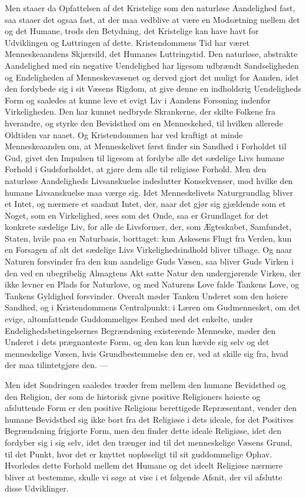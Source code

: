 \documentclass[12pt,a4paper,openany]{book}
\newcommand{\opage}[1]{\marginnote{\footnotesize\textit{[#1]}}}
\begin{document}
Men staaer da Opfattelsen af det Kristelige som den
naturløse Aandelighed fast, saa staaer det ogsaa fast, at der
maa vedblive at være en Modsætning mellem det og det
\opage{455}Humane, trods den Betydning, det Kristelige kan have havt for
Udviklingen og Luttringen af dette. Kristendommens Tid har
været Menneskeaandens Skjærsild, det Humanes Luttringstid.
Den naturløse, abstrakte Aandelighed med sin negative Uendelighed
har ligesom udbrændt Sandseligheden og Endeligheden
af Menneskevæsenet og derved gjort det muligt for Aanden,
idet den fordybede sig i sit Væsens Rigdom, at give denne
en indholdsrig Uendeligheds Form og saaledes at kunne leve
et evigt Liv i Aandens Forsoning indenfor Virkeligheden.
Den har kunnet nedbryde Skrankerne, der skilte Folkene fra
hverandre, og styrke den Bevidsthed om en Menneskehed, til
hvilken allerede Oldtiden var naaet. Og Kristendommen
har ved kraftigt at minde Menneskeaanden om, at Menneskelivet
først finder sin Sandhed i Forholdet til Gud, givet
den Impulsen til ligesom at fordybe alle det sædelige Livs
humane Forhold i Gudsforholdet, at gjøre dem alle til religiøse
Forhold. Men den naturløse Aandeligheds Livsanskuelse
indeslutter Konsekvenser, mod hvilke den humane Livsanskuelse
maa værge sig. Idet Menneskelivets Naturgrundlag
bliver et Intet, og nærmere et saadant Intet, der, naar det
gjør sig gjældende som et Noget, som en Virkelighed, sees
som det Onde, saa er Grundlaget for det konkrete sædelige
Liv, for alle de Livsformer, der, som Ægteskabet, Samfundet,
Staten, hvile paa en Naturbasis, borttaget: kun
Askesens Flugt fra Verden, kun en Forsagen af alt det sædelige
Livs Virkelighedsindhold bliver tilbage. Og naar
Naturen forsvinder fra den kun aandelige Guds Væsen, saa
bliver Guds Virken i den ved en ubegribelig Almagtens
Akt satte Natur den undergjørende Virken, der ikke levner en
Plads for Naturlove, og med Naturens Love falde Tankens
Love, og Tankens Gyldighed forsvinder. Overalt møder
Tanken Underet som den høiere Sandhed, og i Kristendommens
Centralpunkt: i Læren om Gudmennesket, om det evige,
altomfattende Guddommeliges Eenhed med det enkelte, under
Endelighedsbetingelsernes Begrændsning existerende Menneske,
møder den Underet i dets prægnanteste Form, og den kan
\opage{456}kun hævde sig selv og det menneskelige Væsen, hvis Grundbestemmelse
den er, ved at skille sig fra, hvad der maa tilintetgjøre
den. ---

Men idet Sondringen saaledes træder frem mellem den
humane Bevidsthed og den Religion, der som de historisk
givne positive Religioners høieste og afsluttende Form er
den positive Religions berettigede Repræsentant, vender den
humane Bevidsthed sig ikke bort fra det Religiøse i dets ideale,
for det Positives Begrændsning frigjorte Form, men den
finder dette ideale Religiøse, idet den fordyber sig i sig selv,
idet den trænger ind til det menneskelige Væsens Grund, til
det Punkt, hvor det er knyttet uopløseligt til sit guddommelige
Ophav. Hvorledes dette Forhold mellem det Humane
og det ideelt Religiøse nærmere bliver at bestemme, skulle vi
søge at vise i et følgende Afsnit, der vil afslutte disse Udviklinger.
\end{document}

